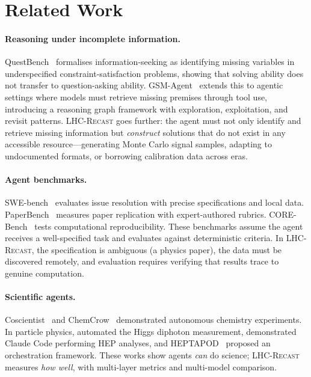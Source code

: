 \documentclass{article}
\newcommand{\toolkit}{\textsc{LHC-Recast}}
\begin{document}
\section{Related Work}
\label{sec:related}

\paragraph{Reasoning under incomplete information.}
QuestBench~\citep{li2025questbench} formalises information-seeking as identifying missing variables in underspecified constraint-satisfaction problems, showing that solving ability does not transfer to question-asking ability.
GSM-Agent~\citep{zhu2025gsmagent} extends this to agentic settings where models must retrieve missing premises through tool use, introducing a reasoning graph framework with exploration, exploitation, and revisit patterns.
\toolkit{} goes further: the agent must not only identify and retrieve missing information but \emph{construct} solutions that do not exist in any accessible resource---generating Monte Carlo signal samples, adapting to undocumented formats, or borrowing calibration data across eras.

\paragraph{Agent benchmarks.}
SWE-bench~\citep{jimenez2024swebench} evaluates issue resolution with precise specifications and local data.
PaperBench~\citep{openai2025paperbench} measures paper replication with expert-authored rubrics.
CORE-Bench~\citep{siegel2024corebench} tests computational reproducibility.
These benchmarks assume the agent receives a well-specified task and evaluates against deterministic criteria.
In \toolkit{}, the specification is ambiguous (a physics paper), the data must be discovered remotely, and evaluation requires verifying that results trace to genuine computation.

\paragraph{Scientific agents.}
Coscientist~\citep{boiko2023coscientist} and ChemCrow~\citep{bran2024chemcrow} demonstrated autonomous chemistry experiments.
In particle physics, \citet{gendreau2024automating} automated the Higgs diphoton measurement, \citet{moreno2026ai} demonstrated Claude Code performing HEP analyses, and HEPTAPOD~\citep{heptapod2024} proposed an orchestration framework.
These works show agents \emph{can} do science; \toolkit{} measures \emph{how well}, with multi-layer metrics and multi-model comparison.
\end{document}
